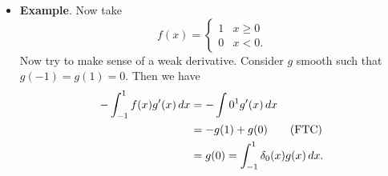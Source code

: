 \documentclass{article}
\newcommand{\?}{\stackrel{?}{=}}
\theoremstyle{definition} %
\newtheorem{definition}[theorem]{Definition} %
\begin{document}
\begin{itemize}
\begin{definition}[Diraq measure]
        This is called the \textbf{Dirac measure}.
    \end{definition}
    \item \textbf{Example}. Now take
    \[
    f(x) =
    \begin{cases}
        1 & x \geq 0 \\
        0 & x < 0.
    \end{cases}
    \]
    Now try to make sense of a weak derivative. Consider $g$ smooth such that $g(-1) = g(1) = 0$. Then we have
    \begin{align*}
        -\int_{-1}^1 f(x)g'(x) \,dx &= -\int0^1 g'(x) \,dx \\
        &= -g(1) + g(0) \tag{\text{FTC}} \\
        &= g(0) = \int_{-1}^1 \delta_0(x)g(x) \,dx.
    \end{align*}
\end{itemize}

\newpage

\listoftheorems[]
\end{document}
